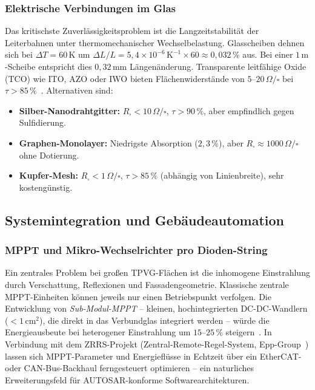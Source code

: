 ﻿\documentclass[a4paper,12pt]{article}
\theoremstyle{definition}
\theoremstyle{remark}
\begin{document}
\subsubsection{Elektrische Verbindungen im Glas}
Das kritischste Zuverlässigkeitsproblem ist die Langzeitstabilität der
Leiterbahnen unter thermomechanischer Wechselbelastung. Glasscheiben
dehnen sich bei $\Delta T = 60\,\mathrm{K}$ um $\Delta L/L = 5{,}4 \times 10^{-6}\,\mathrm{K^{-1}} \times 60 \approx 0{,}032\,\%$ aus. Bei einer
$1\,\mathrm{m}$-Scheibe entspricht dies $0{,}32\,\mathrm{mm}$ Längenänderung.
Transparente leitfähige Oxide (TCO) wie ITO, AZO oder IWO bieten
Flächenwiderstände von $5$--$20\,\Omega/\square$ bei
$\tau > 85\,\%$~\cite{Granqvist2014}. Alternativen sind:
\begin{itemize}
  \item \textbf{Silber-Nanodrahtgitter:} $R_\square < 10\,\Omega/\square$,
    $\tau > 90\,\%$, aber empfindlich gegen Sulfidierung.
  \item \textbf{Graphen-Monolayer:} Niedrigste Absorption ($2{,}3\,\%$),
    aber $R_\square \approx 1000\,\Omega/\square$ ohne Dotierung.
  \item \textbf{Kupfer-Mesh:} $R_\square < 1\,\Omega/\square$,
    $\tau > 85\,\%$ (abhängig von Linienbreite), sehr kostengünstig.
\end{itemize}

\subsection{Systemintegration und Gebäudeautomation}

\subsubsection{MPPT und Mikro-Wechselrichter pro Dioden-String}
Ein zentrales Problem bei großen TPVG-Flächen ist die inhomogene
Einstrahlung durch Verschattung, Reflexionen und Fassadengeometrie.
Klassische zentrale MPPT-Einheiten können jeweils nur einen Betriebspunkt
verfolgen. Die Entwicklung von \emph{Sub-Modul-MPPT} -- kleinen,
hochintegrierten DC-DC-Wandlern ($< 1\,\mathrm{cm^2}$), die direkt
in das Verbundglas integriert werden -- würde die Energieausbeute bei
heterogener Einstrahlung um $15$--$25\,\%$ steigern~\cite{Balato2015}.
In Verbindung mit dem ZRRS-Projekt (Zentral-Remote-Regel-System,
Epp-Group~\cite{Epp2026ZRRS}) lassen sich MPPT-Parameter und
Energieflüsse in Echtzeit über ein EtherCAT- oder CAN-Bus-Backhaul
ferngesteuert optimieren -- ein naturliches Erweiterungsfeld für
AUTOSAR-konforme Softwarearchitekturen.
\end{document}
